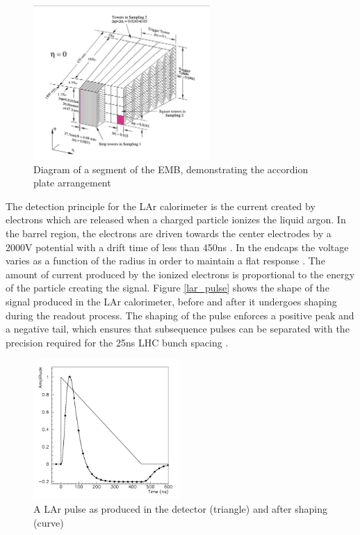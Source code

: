 \begin{figure}
        \centering
	\includegraphics[width=0.6\textwidth]{figures/ch3/lar_accordion.png}
	\caption{Diagram of a segment of the EMB, demonstrating the accordion plate arrangement \cite{lar_tdr}}
	\label{fig:lar_accordion}
\end{figure}

The detection principle for the LAr calorimeter is the current created by electrons which are released when a charged particle ionizes the liquid argon. In the barrel region, the electrons are driven towards the center electrodes by a 2000V potential with a drift time of less than 450ns \cite{lar_overview}. In the endcaps the voltage varies as a function of the radius in order to maintain a flat response \cite{lar_tdr}. The amount of current produced by the ionized electrons is proportional to the energy of the particle creating the signal. Figure \ref{lar_pulse} shows the shape of the signal produced in the LAr calorimeter, before and after it undergoes shaping during the readout process. The shaping of the pulse enforces a positive peak and a negative tail, which ensures that subsequence pulses can be separated with the precision required for the 25ns LHC bunch spacing \cite{lar_tdr}. \\

\begin{figure}
        \centering
	\includegraphics[width=0.5\textwidth]{figures/ch3/lar_pulse.png}
	\caption{A LAr pulse as produced in the detector (triangle) and after shaping (curve) \cite{lar_tdr}}
	\label{fig:lar_pulse}
\end{figure}

